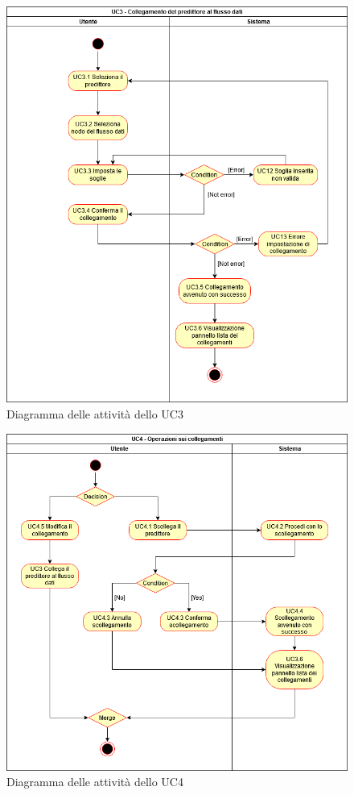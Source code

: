 \begin{figure}[H]
\centering
\includegraphics[scale=0.6]{../../Diagrams/Activity_diagrams/uc3.png}
\caption{Diagramma delle attività dello UC3}
\end{figure}
\begin{figure}[H]
\centering
\includegraphics[scale=0.6]{../../Diagrams/Activity_diagrams/uc4.png}
\caption{Diagramma delle attività dello UC4}
\end{figure}
